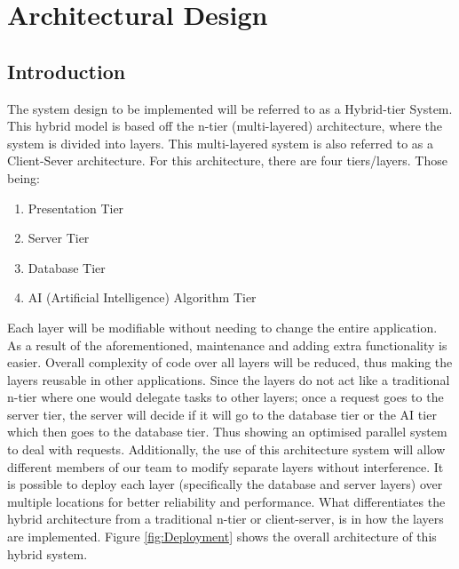 \documentclass[a4paper,12pt]{article}
\begin{document}
	\section{Architectural Design}
	\begin{adjustwidth}{2.5em}{0pt}
		\subsection{Introduction}
		\begin{flushleft}
			The system design to be implemented will be referred to as a Hybrid-tier System. This hybrid model is based off the n-tier (multi-layered) architecture, where the system is divided into layers. This multi-layered system is also referred to as a Client-Sever architecture. For this architecture, there are four tiers/layers. Those being: 
			\begin{enumerate}
				\item Presentation Tier
				\item Server Tier
				\item Database Tier
				\item AI (Artificial Intelligence) Algorithm Tier
			\end{enumerate}
			Each layer will be modifiable without needing to change the entire application. As a result of the aforementioned, maintenance and adding extra functionality is easier. Overall complexity of code over all layers will be reduced, thus making the layers reusable in other applications. Since the layers do not act like a traditional n-tier where one would delegate tasks to other layers; once a request goes to the server tier, the server will decide if it will go to the database tier or the AI tier which then goes to the database tier. Thus showing an optimised parallel system to deal with requests.
			Additionally, the use of this architecture system will allow different members of our team to modify separate layers without interference. It is possible to deploy each layer (specifically the database and server layers) over multiple locations for better reliability and performance. What differentiates the hybrid architecture from a traditional n-tier or client-server, is in how the layers are implemented. Figure \ref{fig:Deployment} shows the overall architecture of this hybrid system.
			\begin{figure}[h]
				\centering

\end{figure}
\end{flushleft}
\end{adjustwidth}
\end{document}
